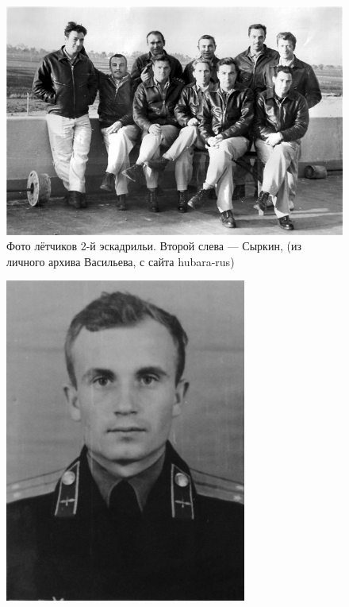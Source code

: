 \begin{itemize}
	\begin{figure}[h!tb] 
		\centering\includegraphics[scale=0.4]{Dolina_4/C66R0acj3xk.jpg}
		\caption{Фото лётчиков 2-й эскадрильи. Второй слева — Сыркин, (из личного архива Васильева, с сайта hubara-rus)}%
	\end{figure}
	\begin{figure}[h!tb] 
		\centering\includegraphics[scale=0.4]{Dolina_4/7KipCSMMz64.jpg}

\end{figure}
\end{itemize}

